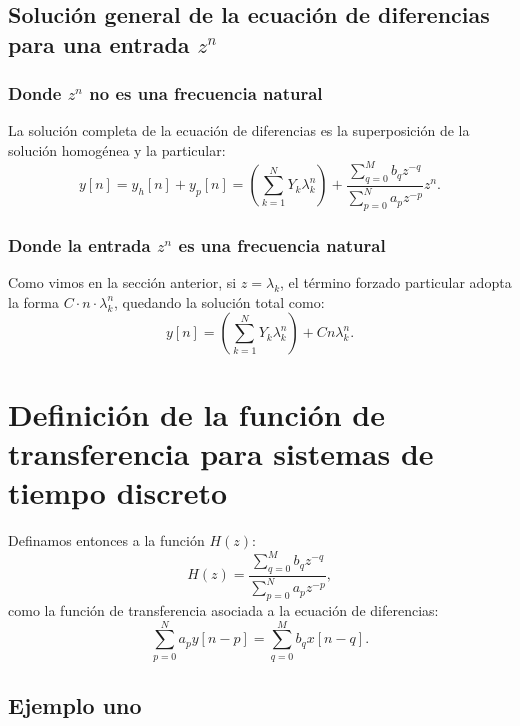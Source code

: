 \documentclass[11pt,a4paper,openany]{book}
\begin{document}
\subsection{Soluci\'{o}n general de la ecuaci\'{o}n de diferencias para una entrada $z^{n}$}

\subsubsection{Donde $z^{n}$ no es una frecuencia natural}

La soluci\'{o}n completa de la ecuaci\'{o}n de diferencias es la superposición de la solución homogénea y la particular:
\begin{equation}
	y[n] = y_{h}[n] + y_{p}[n] = \left(\sum_{k=1}^{N}Y_{k}\lambda_{k}^n \right) + \frac{\sum_{q=0}^{M}b_{q}z^{-q}}{\sum_{p=0}^{N}a_{p}z^{-p}} z^{n}.
\end{equation}

\subsubsection{Donde la entrada $z^{n}$ es una frecuencia natural}

Como vimos en la sección anterior, si $z = \lambda_k$, el término forzado particular adopta la forma $C \cdot n \cdot \lambda_k^n$, quedando la solución total como:
\begin{equation}
	y[n] = \left(\sum_{k=1}^{N}Y_{k}\lambda_{k}^n \right) + C n \lambda_k^{n}.
\end{equation}

\section{Definici\'{o}n de la funci\'{o}n de transferencia para sistemas de tiempo discreto}

Definamos entonces a la función $H(z)$:
\begin{equation}
	H(z) = \frac{\sum_{q=0}^{M}b_{q}z^{-q}}{\sum_{p=0}^{N}a_{p}z^{-p}}, \label{eqhzdef}
\end{equation}
como la funci\'{o}n de transferencia asociada a la ecuaci\'{o}n de diferencias:
\begin{equation}
	\sum_{p=0}^{N}a_{p} y[n-p] = \sum_{q=0}^{M}b_{q} x[n-q].
\end{equation}

\subsection{Ejemplo uno}
\end{document}
